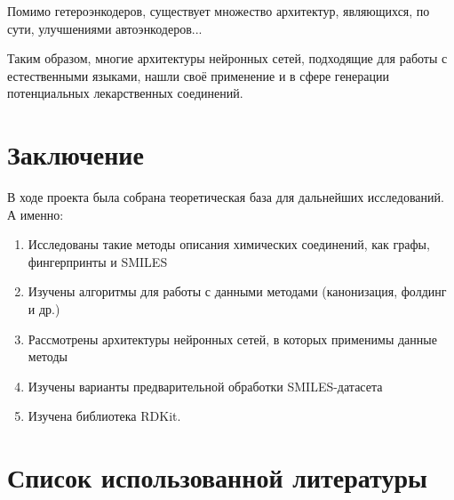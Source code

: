 \documentclass[a4paper,14pt]{extreport}
\begin{document}
  Помимо гетероэнкодеров, существует множество архитектур, являющихся, по сути, улучшениями автоэнкодеров...
  
  Таким образом, многие архитектуры нейронных сетей, подходящие для работы с естественными языками, нашли своё применение и в сфере генерации потенциальных лекарственных соединений.
  

  \chapter*{Заключение}
  \label{c:conclusion}
 В ходе проекта была собрана теоретическая база для дальнейших исследований. А именно:
  \begin{enumerate}
  \item Исследованы такие методы описания химических соединений, как графы, фингерпринты и SMILES
  \item Изучены алгоритмы для работы с данными методами (канонизация, фолдинг и др.)
  \item Рассмотрены архитектуры нейронных сетей, в которых применимы данные методы
  \item Изучены варианты предварительной обработки SMILES-датасета
  \item Изучена библиотека RDKit.
  \end{enumerate}
  

  \chapter*{Список использованной литературы}
  \label{c:literature}
\end{document}
